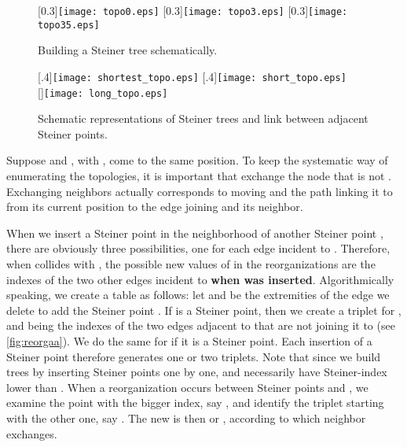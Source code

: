 \documentclass{article}
\theoremstyle{plain}
\begin{document}
\begin{figure}
	\centering
		[0.3\textwidth]{\texttt{[image: topo0.eps]}} \quad
		[0.3\textwidth]{\texttt{[image: topo3.eps]}} \quad
		[0.3\textwidth]{\texttt{[image: topo35.eps]}}
	\caption{Building a Steiner tree schematically.}\label{fig:topo}
\end{figure}




\begin{figure}
	\centering
		[.4\textwidth]{\texttt{[image: shortest\_topo.eps]}} \quad
		[.4\textwidth]{\texttt{[image: short\_topo.eps]}}\\
		[\textwidth]{\texttt{[image: long\_topo.eps]}}
	\caption{Schematic representations of Steiner trees and link between adjacent Steiner points.}\label{fig:reorga}
\end{figure}





Suppose  and , with , come to the same position. 
To keep the systematic way of enumerating the topologies, it is important that  exchange the node that is not . 
Exchanging neighbors actually corresponds to moving  and the path linking it to  from its current position to the edge joining  and its neighbor. 



When we insert a Steiner point  in the neighborhood of another Steiner point , there are obviously three possibilities, one for each edge incident to . 
Therefore, when  collides with , the possible new values of  in the reorganizations are the indexes of the two other edges incident to  \textbf{when  was inserted}.  
Algorithmically speaking, we create a table as follows: let  and  be the extremities of the edge we delete to add the Steiner point . 
If  is a Steiner point, then we create a triplet  for ,  and  being the indexes of the two edges adjacent to  that are not joining it to  (see \cref{fig:reorgaa}). 
We do the same for  if it is a Steiner point. 
Each insertion of a Steiner point therefore generates one or two triplets. 
Note that since we build trees by inserting Steiner points one by one,  and  necessarily have Steiner-index lower than . 
When a reorganization occurs between Steiner points  and , we examine the point with the bigger index, say , and identify the triplet starting with the other one, say . The new  is then  or , according to which neighbor  exchanges. 
\end{document}
